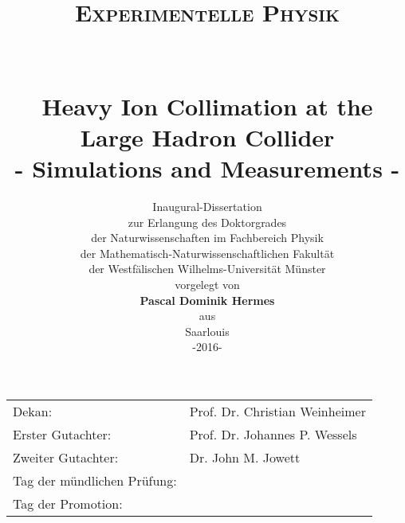

\title{\Large{\textsc{Experimentelle Physik}}
\\ \mbox{} \vspace{1cm} \\ \mbox{} \\
\huge{Heavy Ion Collimation at the Large Hadron Collider \\ - Simulations and Measurements -}}


\date{\vspace{1cm}  
\large{Inaugural-Dissertation}\\\vspace{0.1cm}zur Erlangung des Doktorgrades\\\vspace{0.1cm}der Naturwissenschaften im Fachbereich Physik\\\vspace{0.1cm}der Mathematisch-Naturwissenschaftlichen Fakult\"{a}t \\ \vspace{0.1cm} der Westf\"{a}lischen Wilhelms-Universit\"{a}t M\"{u}nster \\ \vspace{1cm} vorgelegt von \\ \vspace{0.1cm} \textbf{Pascal Dominik Hermes} \\ \vspace{0.1cm} aus \\  Saarlouis \\\vspace{1cm} \large{-2016-}}
\maketitle

\newpage
 \vspace*{\fill}
\begin{table}[htbp]
\begin{flushleft}
\begin{tabular}{ll}

Dekan: & Prof. Dr. Christian Weinheimer \\ 
Erster Gutachter: & Prof. Dr. Johannes P. Wessels \\ 
Zweiter Gutachter: &  Dr. John M. Jowett  \\ 
Tag der m\"{u}ndlichen Pr\"{u}fung: &  \\ 
Tag der Promotion: &  \\ 
\end{tabular}
\end{flushleft}
\end{table}




